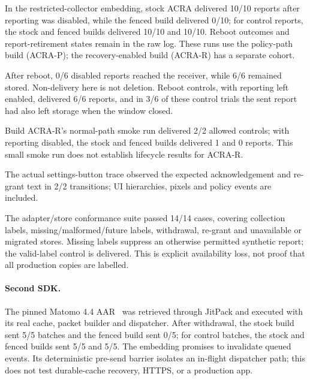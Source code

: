 In the restricted-collector embedding, stock ACRA delivered 10/10 reports after reporting was disabled, while the fenced build delivered 0/10; for control reports, the stock and fenced builds delivered 10/10 and 10/10. Reboot outcomes and report-retirement states remain in the raw log. These runs use the policy-path build (ACRA-P); the recovery-enabled build (ACRA-R) has a separate cohort.

After reboot, 0/6 disabled reports reached the receiver, while 6/6 remained stored. Non-delivery here is not deletion. Reboot controls, with reporting left enabled, delivered 6/6 reports, and in 3/6 of these control trials the sent report had also left storage when the window closed.

Build ACRA-R's normal-path smoke run delivered 2/2 allowed controls; with reporting disabled, the stock and fenced builds delivered 1 and 0 reports. This small smoke run does not establish lifecycle results for ACRA-R.

The actual settings-button trace observed the expected acknowledgement and re-grant text in 2/2 transitions; UI hierarchies, pixels and policy events are included.

The adapter/store conformance suite passed 14/14 cases, covering collection labels, missing/malformed/future labels, withdrawal, re-grant and unavailable or migrated stores. Missing labels suppress an otherwise permitted synthetic report; the valid-label control is delivered. This is explicit availability loss, not proof that all production copies are labelled.

\paragraph{Second SDK.} The pinned Matomo 4.4 AAR~\cite{matomo} was retrieved through JitPack and executed with its real cache, packet builder and dispatcher. After withdrawal, the stock build sent 5/5 batches and the fenced build sent 0/5; for control batches, the stock and fenced builds sent 5/5 and 5/5. The embedding promises to invalidate queued events. Its deterministic pre-send barrier isolates an in-flight dispatcher path; this does not test durable-cache recovery, HTTPS, or a production app.

